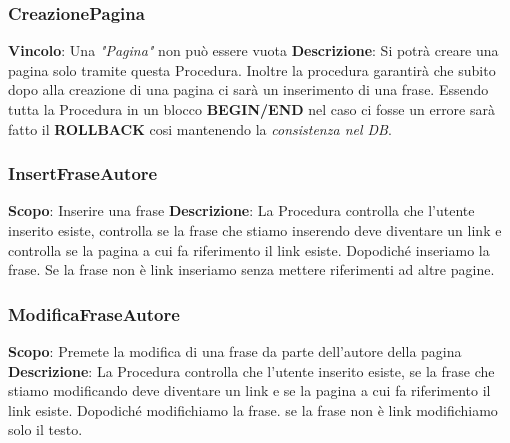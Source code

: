 \hypertarget{CreazionePagina}{}
\subsubsection{CreazionePagina}
\textbf{Vincolo}: Una \textit{"Pagina"} non può essere vuota \newline\newline
\textbf{Descrizione}: Si potrà creare una pagina solo tramite questa Procedura. Inoltre la procedura garantirà che subito dopo alla creazione di una pagina ci sarà un inserimento di una frase. Essendo tutta la Procedura in un blocco \textbf{BEGIN/END} nel caso ci fosse un errore sarà fatto il \textbf{ROLLBACK} cosi mantenendo la \textit{consistenza nel DB}.\newline


\newpage
\subsubsection{InsertFraseAutore}
\textbf{Scopo}: Inserire una frase \newline\newline
\textbf{Descrizione}: La Procedura controlla che l'utente inserito esiste, controlla se la frase che stiamo inserendo deve diventare un link e controlla se la pagina a cui fa riferimento il link esiste. Dopodiché inseriamo la frase. Se la frase non è link inseriamo senza mettere riferimenti ad altre pagine. \newline


\newpage
\subsubsection{ModificaFraseAutore}
\textbf{Scopo}: Premete la modifica di una frase da parte dell'autore della pagina \newline\newline
\textbf{Descrizione}: La Procedura controlla che l'utente inserito esiste, se la frase che stiamo modificando deve diventare un link e se la pagina a cui fa riferimento il link esiste. Dopodiché modifichiamo la frase. se la frase non è link modifichiamo solo il testo.\newline


\newpage
